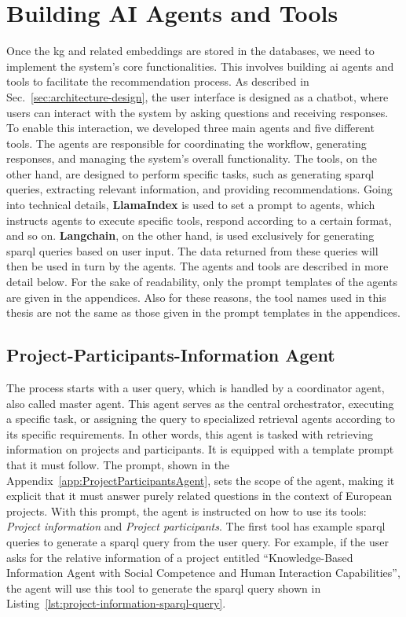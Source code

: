 \section{Building AI Agents and Tools}\label{sec:building-ai-agents}
Once the \gls{kg} and related embeddings are stored in the databases, we need to implement the system's core functionalities.
This involves building \gls{ai} agents and tools to facilitate the recommendation process.
As described in Sec.~\ref{sec:architecture-design}, the user interface is designed as a chatbot, where users can interact with the system by asking questions and receiving responses.
To enable this interaction, we developed three main agents and five different tools.
The agents are responsible for coordinating the workflow, generating responses, and managing the system's overall functionality.
The tools, on the other hand, are designed to perform specific tasks, such as generating \gls{sparql} queries, extracting relevant information, and providing recommendations.
Going into technical details, \textbf{LlamaIndex} is used to set a prompt to agents, which instructs agents to execute specific tools, respond according to a certain format, and so on.
\textbf{Langchain}, on the other hand, is used exclusively for generating \gls{sparql} queries based on user input.
The data returned from these queries will then be used in turn by the agents.
The agents and tools are described in more detail below.
For the sake of readability, only the prompt templates of the agents are given in the appendices.
Also for these reasons, the tool names used in this thesis are not the same as those given in the prompt templates in the appendices.


\subsection*{Project-Participants-Information Agent}
The process starts with a user query, which is handled by a coordinator agent, also called master agent.
This agent serves as the central orchestrator, executing a specific task, or assigning the query to specialized retrieval agents according to its specific requirements.
In other words, this agent is tasked with retrieving information on projects and participants.
It is equipped with a template prompt that it must follow.
The prompt, shown in the Appendix~\ref{app:ProjectParticipantsAgent}, sets the scope of the agent, making it explicit that it must answer purely related questions in the context of European projects.
With this prompt, the agent is instructed on how to use its tools: \textit{Project information} and \textit{Project participants}.
The first tool has example \gls{sparql} queries to generate a \gls{sparql} query from the user query.
For example, if the user asks for the relative information of a project entitled ``Knowledge-Based Information Agent with Social Competence and Human Interaction Capabilities'', the agent will use this tool to generate the \gls{sparql} query shown in Listing~\ref{lst:project-information-sparql-query}.

